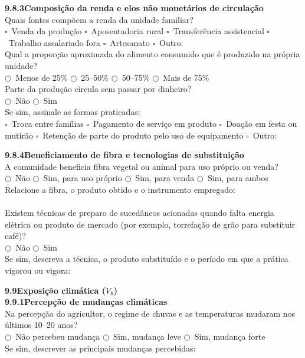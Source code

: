 \medskip\noindent\textbf{9.8.3\quad Composição da renda e elos não monetários de circulação}\\[2pt]
Quais fontes compõem a renda da unidade familiar?\\
$\square$~Venda da produção \quad $\square$~Aposentadoria rural \quad $\square$~Transferência assistencial \quad $\square$~Trabalho assalariado fora \quad $\square$~Artesanato \quad $\square$~Outro: \dotfill\\[2pt]
Qual a proporção aproximada do alimento consumido que é produzido na própria unidade?\\
$\bigcirc$~Menos de 25\% \quad $\bigcirc$~25--50\% \quad $\bigcirc$~50--75\% \quad $\bigcirc$~Mais de 75\%\\[2pt]
Parte da produção circula sem passar por dinheiro?\\
$\bigcirc$~Não \quad $\bigcirc$~Sim\\[2pt]
Se sim, assinale as formas praticadas:\\
$\square$~Troca entre famílias \quad $\square$~Pagamento de serviço em produto \quad $\square$~Doação em festa ou mutirão \quad $\square$~Retenção de parte do produto pelo uso de equipamento \quad $\square$~Outro: \dotfill

\medskip\noindent\textbf{9.8.4\quad Beneficiamento de fibra e tecnologias de substituição}\\[2pt]
A comunidade beneficia fibra vegetal ou animal para uso próprio ou venda?\\
$\bigcirc$~Não \quad $\bigcirc$~Sim, para uso próprio \quad $\bigcirc$~Sim, para venda \quad $\bigcirc$~Sim, para ambos\\[2pt]
Relacione a fibra, o produto obtido e o instrumento empregado: \dotfill\\[2pt]\dotfill\\[2pt]
Existem técnicas de preparo de sucedâneos acionadas quando falta energia elétrica ou produto de mercado (por exemplo, torrefação de grão para substituir café)?\\
$\bigcirc$~Não \quad $\bigcirc$~Sim\\[2pt]
Se sim, descreva a técnica, o produto substituído e o período em que a prática vigorou ou vigora: \dotfill\\[2pt]\dotfill

\bigskip\noindent\textbf{9.9\quad Exposição climática ($V_8$)}\\[6pt]

\noindent\textbf{9.9.1\quad Percepção de mudanças climáticas}\\[2pt]
Na percepção do agricultor, o regime de chuvas e as temperaturas mudaram nos últimos 10--20 anos?\\
$\bigcirc$~Não percebeu mudança \quad $\bigcirc$~Sim, mudança leve \quad $\bigcirc$~Sim, mudança forte\\[2pt]
Se sim, descrever as principais mudanças percebidas: \dotfill\\[2pt]\dotfill

